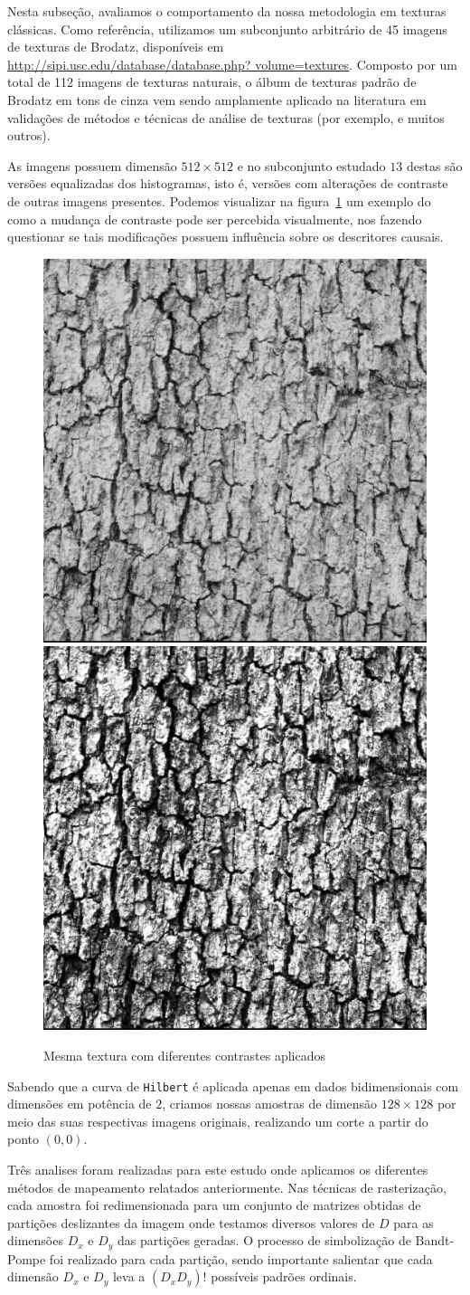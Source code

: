\documentclass[remotesensing,article,submit,moreauthors,pdftex,10pt,a4paper]{Definitions/mdpi}
\begin{document}
	Nesta subseção, avaliamos o comportamento da nossa metodologia em texturas clássicas.
	Como referência, utilizamos um subconjunto arbitrário de 45 imagens de texturas de Brodatz, disponíveis em \url{http://sipi.usc.edu/database/database.php? volume=textures}. 
	Composto por um total de 112 imagens de texturas naturais, o álbum de texturas padrão de Brodatz em tons de cinza \cite{Brodatz1996Textures} vem sendo amplamente aplicado na literatura em validações de métodos e técnicas de análise de texturas (por exemplo, \cite{Sarkar1995Multifractal, Lee2010Robust, Florindo2012Fractal, Goncalves2014Texture, Oliveira2015Feature, Davarzani2015Scale, zunino2016discriminating} e muitos outros).
	
	As imagens possuem dimensão $512 \times 512$ e no subconjunto estudado $13$ destas são versões equalizadas dos histogramas, isto é, versões com alterações de contraste de outras imagens presentes. Podemos visualizar na figura~\ref{fig:TwoTexturesDifferentContrast} um exemplo do como a mudança de contraste pode ser percebida visualmente, nos fazendo questionar se tais modificações possuem influência sobre os descritores causais.
	
	\begin{figure}[!h]
		\centering
		\includegraphics[width=.23\linewidth]{Figures/1102.png}
		\includegraphics[width=.23\linewidth]{Figures/1202.png}
		\caption{Mesma textura com diferentes contrastes aplicados}
		\label{fig:TwoTexturesDifferentContrast}
	\end{figure}
	
	Sabendo que a curva de \texttt{Hilbert} é aplicada apenas em dados bidimensionais com dimensões em potência de $2$, criamos nossas amostras de dimensão $128 \times 128$ por meio das suas respectivas imagens originais, realizando um corte a partir do ponto $(0,0)$.
	
	Três analises foram realizadas para este estudo onde aplicamos os diferentes métodos de mapeamento relatados anteriormente.
	Nas técnicas de rasterização, cada amostra foi redimensionada para um conjunto de matrizes obtidas de partições deslizantes da imagem onde testamos diversos valores de $D$ para as dimensões $D_{x}$ e $D_{y}$ das partições geradas. 
	O processo de simbolização de Bandt-Pompe foi realizado para cada partição, sendo importante salientar que cada dimensão $D_{x}$ e $D_{y}$ leva a $(D_{x}D_{y})!$ possíveis padrões ordinais. 
	
\end{document}
